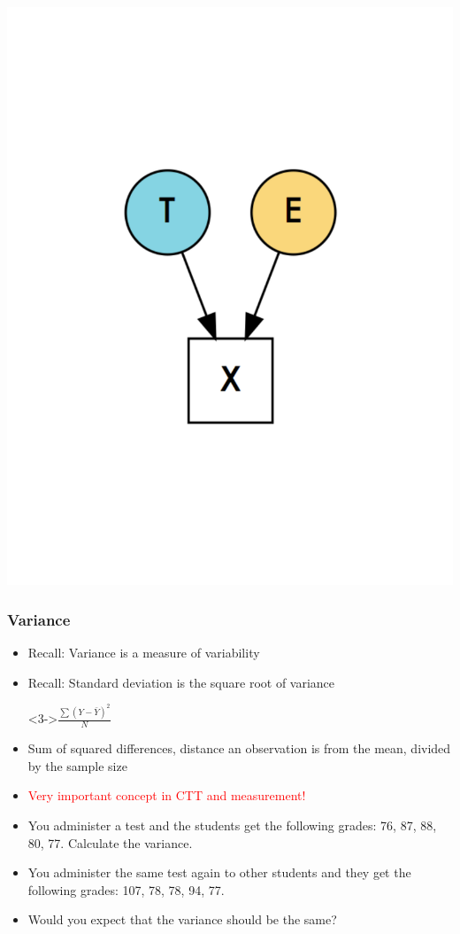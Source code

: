 \documentclass[dvipsnames]{beamer}\usepackage[]{graphicx}\usepackage[]{color}
\begin{document}
\begin{frame}
\centering
\includegraphics[trim = 0 0 0 130, clip = T, scale = .5]{images/ctt.pdf}


\end{frame}

\begin{frame}
\frametitle{Variance}
\begin{itemize}
  \item<1-> Recall: Variance is a measure of variability
  \item<2-> Recall: Standard deviation is the square root of variance
  \item[]<3->\centering $\frac{\sum(Y - \bar{Y})^2}{N} $
  \item<4-> Sum of squared differences, distance an observation is from the mean, divided by the sample size 
  \item<5-> \textcolor{red}{Very important concept in CTT and measurement!}
  \item<6-> You administer a test and the students get the following grades: 76, 87, 88, 80, 77. Calculate the variance.
  \item<7-> You administer the same test again to other students and they get the following grades: 107, 78, 78, 94, 77. 
  \item<8-> Would you expect that the variance should be the same?
\end{itemize}
\end{frame}
\end{document}
